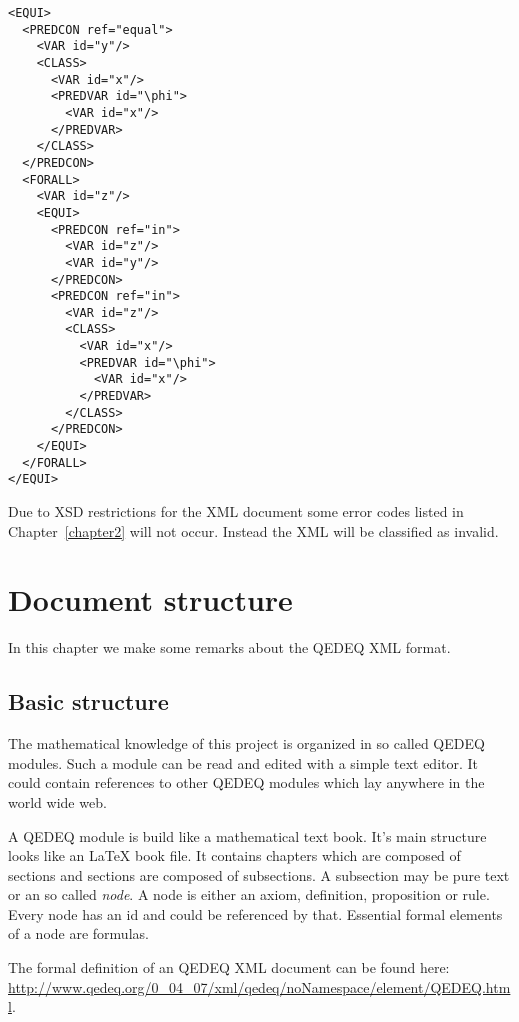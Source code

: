 \documentclass[a4paper,german,10pt,twoside]{book}
\theoremstyle{definition}
\theoremstyle{remark}
\begin{document}
\begin{verbatim}
<EQUI>
  <PREDCON ref="equal">
    <VAR id="y"/>
    <CLASS>
      <VAR id="x"/>
      <PREDVAR id="\phi">
        <VAR id="x"/>
      </PREDVAR>
    </CLASS>
  </PREDCON>
  <FORALL>
    <VAR id="z"/>
    <EQUI>
      <PREDCON ref="in">
        <VAR id="z"/>
        <VAR id="y"/>
      </PREDCON>
      <PREDCON ref="in">
        <VAR id="z"/>
        <CLASS>
          <VAR id="x"/>
          <PREDVAR id="\phi">
            <VAR id="x"/>
          </PREDVAR>
        </CLASS>
      </PREDCON>
    </EQUI>
  </FORALL>
</EQUI>
\end{verbatim}

Due to XSD restrictions for the XML document some error codes listed in Chapter~\ref{chapter2} will not occur. Instead the XML will be classified as invalid.



\chapter{Document structure} \label{chapter5} \hypertarget{chapter5}{}

In this chapter we make some remarks about the QEDEQ XML format.

\section{Basic structure} \label{chapter5_section1} \hypertarget{chapter5_section1}{}
The mathematical knowledge of this project is organized in so called QEDEQ modules. Such a module can be read and edited with a simple text editor. It could contain references to other QEDEQ modules which lay anywhere in the world wide web.
\par
A QEDEQ module is build like a mathematical text book. It's main structure looks like an \LaTeX{} book file. It contains chapters which are composed of sections and sections are composed of subsections. A subsection may be pure text or an so called \emph{node}. A node is either an axiom, definition, proposition or rule. Every node has an id and could be referenced by that. Essential formal elements of a node are formulas.
\par
The formal definition of an QEDEQ XML document can be found here: \url{http://www.qedeq.org/0_04_07/xml/qedeq/noNamespace/element/QEDEQ.html}.
\end{document}
